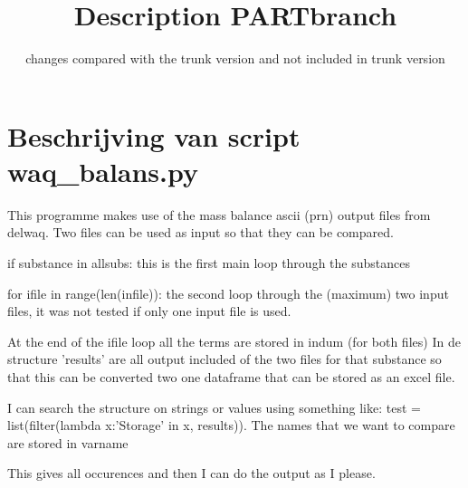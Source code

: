 \documentclass[english]{deltares_manual}
\title{Description PARTbranch}
\subtitle{changes compared with the trunk version and not included in trunk version}
\begin{document}
	
\deltarestitle
\section{Beschrijving van script waq\_balans.py}

This programme makes use of the mass balance ascii (prn) output files from delwaq.
Two files can be used as input so that they can be compared.

if substance in allsubs: this is the first main loop through the substances 

\begin{description}
	\item for ifile in range(len(infile)): the second loop through the (maximum) two input files, it was not tested if only one input file is used.
\end{description}

At the end of the ifile loop all the terms are stored in indum (for both files)
In de structure 'results' are all output included of the two files for that substance so that this can be converted two one dataframe that can be stored as an excel file. 

I can search the structure on strings or values using something like:
test = list(filter(lambda x:'Storage' in x, results)). The names that we want to compare are stored in varname

This gives all occurences and then I can do the output as I please.


	

\end{document}
